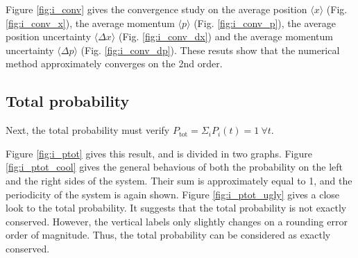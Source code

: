 \documentclass[a4paper,12pt,twoside]{article}
\begin{document}
    Figure \ref{fig:i_conv} gives the convergence study on the average position $\langle x \rangle$ (Fig. \ref{fig:i_conv_x}), the average momentum $\langle p \rangle$ (Fig. \ref{fig:i_conv_p}), the average position uncertainty $\langle \Delta x \rangle$ (Fig. \ref{fig:i_conv_dx}) and the average momentum uncertainty $\langle \Delta p \rangle$ (Fig. \ref{fig:i_conv_dp}).
    These resuts show that the numerical method approximately converges on the 2nd order.


  \subsection{Total probability}
    Next, the total probability must verify $P_\text{tot} = \Sigma_i P_i(t) = 1~\forall t$.

    Figure \ref{fig:i_ptot} gives this result, and is divided in two graphs.
    Figure \ref{fig:i_ptot_cool} gives the general behavious of both the probability on the left and the right sides of the system.
    Their sum is approximately equal to 1, and the periodicity of the system is again shown.
    Figure \ref{fig:i_ptot_ugly} gives a close look to the total probability.
    It suggests that the total probability is not exactly conserved.
    However, the vertical labels only slightly changes on a rounding error order of magnitude.
    Thus, the total probability can be considered as exactly conserved.
\end{document}
